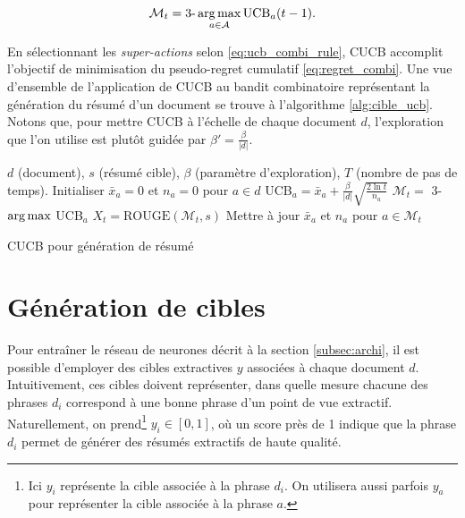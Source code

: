 \begin{equation}
    \mathcal{M}_t = \text{3-}\operatorname*{arg\,max}_{a \in \mathcal{A}} \text{UCB}_a(t - 1).
    \label{eq:ucb_combi_rule}
\end{equation}

En sélectionnant les \textit{super-actions} selon \eqref{eq:ucb_combi_rule},
CUCB accomplit l'objectif de minimisation du pseudo-regret cumulatif \eqref{eq:regret_combi}.
Une vue d'ensemble de l'application de CUCB au bandit combinatoire 
représentant la génération du résumé d'un document se trouve 
à l'algorithme \ref{alg:cible_ucb}.
Notons que, pour mettre CUCB à l'échelle de chaque document $d$, 
l'exploration que l'on utilise est plutôt guidée par $\beta' = \frac{\beta}{|d|}$.

\begin{algorithm}[!ht]
    \begin{algorithmic}[1]
        \Require $d$ (document), $s$ (résumé cible), $\beta$ (paramètre d'exploration), $T$ (nombre de pas de temps).
        \State Initialiser $\bar{x}_a =0$ et $n_a = 0$ pour $a \in d$
        \State UCB$_a = \bar{x}_a + \frac{\beta}{|d|} \sqrt{\frac{2 \ln t}{n_a}}$
        \EndFor
        \State $\mathcal{M}_t =$ 3-$\operatorname*{arg\,max}$ UCB$_a$
        \State $X_t = \text{ROUGE}(\mathcal{M}_t, s)$
        \State Mettre à jour $\bar{x}_a$ et $n_a$ pour {$a \in \mathcal{M}_t$}
        \EndFor
    \end{algorithmic}
    \caption{CUCB pour génération de résumé}
    \label{alg:cible_ucb}
\end{algorithm}

\section{Génération de cibles}
\label{sec:cibles_ucb}

Pour entraîner le réseau de neurones décrit à la section
\ref{subsec:archi}, il est possible d'employer 
des cibles extractives $y$ associées à chaque document $d$.
Intuitivement, ces cibles doivent représenter,
dans quelle mesure chacune des phrases $d_i$
correspond à une bonne phrase d'un point de vue extractif.
Naturellement, on prend\footnote{Ici $y_i$ 
représente la cible associée à la phrase $d_i$. On utilisera aussi parfois $y_a$
pour représenter la cible associée à la phrase $a$.} $y_i \in [0, 1]$, où un score 
près de 1 indique que la phrase $d_i$ permet de générer 
des résumés extractifs de haute qualité.

